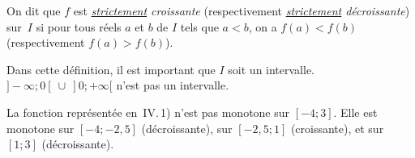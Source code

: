 \begin{rem}
  \begin{minipage}[t]{0.84\linewidth}
  On dit que $f$ est \emph{\underline{strictement} croissante}
  (respectivement \emph{\underline{strictement} décroissante}) sur~$I$
  si pour tous réels $a$ et $b$ de $I$ tels que $a<b$, on a
  $f(a)<f(b)$ (respectivement $f(a)>f(b)$).  \\
  \end{minipage}
\end{rem}

\begin{rem}
  \begin{minipage}[t]{0.8\linewidth}
    Dans cette définition, il est important que $I$ soit un
    intervalle. \\ $]-\infty;0[\ \cup \ ]0;+\infty[$ n'est pas un
    intervalle. \\
  \end{minipage}
\end{rem}

\begin{definition}
\end{definition}

\smallskip

La fonction représentée en \,IV.\,1) n'est pas
monotone sur $[-4;3]$. Elle est monotone sur $[-4;-2,5]$
(décroissante), sur $[-2,5;1]$ (croissante), et sur $[1;3]$ (décroissante).\\

\begin{definition}
\end{definition}

